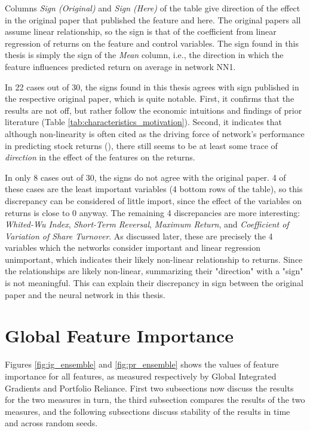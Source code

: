 	Columns \textit{Sign (Original)} and \textit{Sign (Here)} of the table give direction of the effect in the original paper that published the feature and here. The original papers all assume linear relationship, so the sign is that of the coefficient from linear regression of returns on the feature and control variables. The sign found in this thesis is simply the sign of the \textit{Mean} column, i.e., the direction in which the feature influences predicted return on average in network NN1. 
	
	In 22 cases out of 30, the signs found in this thesis agrees with sign published in the respective original paper, which is quite notable. First, it confirms that the results are not off, but rather follow the economic intuitions and findings of prior literature (Table \ref{tab:characteristics_motivation}). Second, it indicates that although non-linearity is often cited as the driving force of network's performance in predicting stock returns (\cite{gu2020empirical}), there still seems to be at least some trace of \textit{direction} in the effect of the features on the returns.   
	
	In only 8 cases out of 30, the signs do not agree with the original paper. 4 of these cases are the least important variables (4 bottom rows of the table), so this discrepancy can be considered of little import, since the effect of the variables on returns is close to 0 anyway. The remaining 4 discrepancies are more interesting: \textit{Whited-Wu Index}, \textit{Short-Term Reversal}, \textit{Maximum Return}, and \textit{Coefficient of Variation of Share Turnover}. As discussed later, these are precisely the 4 variables which the networks consider important and linear regression unimportant, which indicates their likely non-linear relationship to returns. Since the relationships are likely non-linear, summarizing their "direction" with a "sign" is not meaningful. This can explain their discrepancy in sign between the original paper and the neural network in this thesis. 
	
	
\section{Global Feature Importance}
	\label{chap:global_feature_importance}
	
	Figures \ref{fig:ig_ensemble} and \ref{fig:pr_ensemble} shows the values of feature importance for all features, as measured respectively by Global Integrated Gradients and Portfolio Reliance. First two subsections now discuss the results for the two measures in turn, the third subsection compares the results of the two measures, and the following subsections discuss stability of the results in time and across random seeds. 
	
